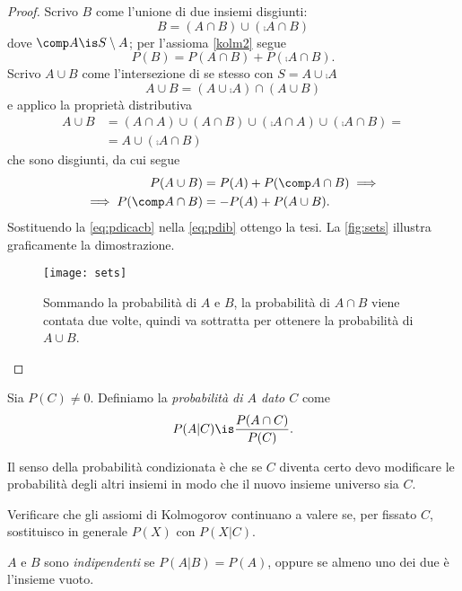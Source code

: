 \begin{proof}
	Scrivo $B$ come l'unione di due insiemi disgiunti:
	\[B = (A\cap B) \cup (\comp A \cap B)\]
	dove $\comp A\is S\setminus A$; per l'assioma \ref{kolm2} segue
	\begin{equation}
		\label{eq:pdib}
		P(B) = P(A\cap B) + P(\comp A \cap B).
	\end{equation}
	Scrivo $A\cup B$ come l'intersezione di se stesso con $S=A\cup\comp A$
	\[A\cup B = (A\cup\comp A) \cap (A\cup B)\]
	e applico la proprietà distributiva
	\begin{align*}
		A\cup B
		&= (A\cap A) \cup (A\cap B) \cup (\comp A\cap A) \cup (\comp A \cap B) = \\
		&= A \cup (\comp A\cap B)
	\end{align*}
	che sono disgiunti, da cui segue
	\begin{align}
		P(A\cup B)
		&= P(A) + P(\comp A\cap B) \implies \notag \\
		\implies P(\comp A\cap B)
		&= -P(A) + P(A\cup B). \label{eq:pdicacb}
	\end{align}
	Sostituendo la \eqref{eq:pdicacb} nella \eqref{eq:pdib} ottengo la tesi.
    La \autoref{fig:sets} illustra graficamente la dimostrazione.
    \begin{figure}
        \centering\texttt{[image: sets]}%
        \caption{Sommando la probabilità di $A$ e $B$, la probabilità di
        $A \cap B$ viene contata due volte, quindi va sottratta per ottenere
        la probabilità di $A \cup B$.} \label{fig:sets}
    \end{figure}
\end{proof}

\begin{definition}
	Sia $P(C)\neq 0$. Definiamo la \emph{probabilità di $A$ dato $C$} come
	\[P(A|C) \is \frac{P(A\cap C)}{P(C)}.\]
\end{definition}

\noindent Il senso della probabilità condizionata è che se $C$ diventa certo
devo modificare le probabilità degli altri insiemi in modo che il nuovo insieme universo sia $C$.

\begin{exercise}
	Verificare che gli assiomi di Kolmogorov continuano a valere se, per fissato $C$, sostituisco in generale $P(X)$ con $P(X|C)$.
\end{exercise}

\begin{definition}[Indipendenza]
	$A$ e $B$ sono \emph{indipendenti} se $P(A|B) = P(A)$,
	oppure se almeno uno dei due è l'insieme vuoto.
\end{definition}

